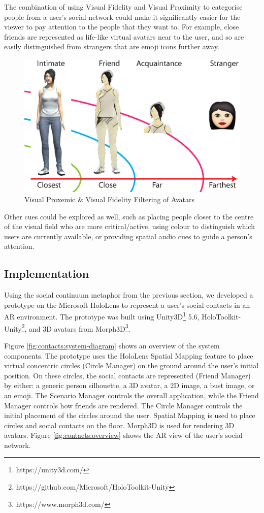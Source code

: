 The combination of using Visual Fidelity and Visual Proximity to categorise people from a user's social network could make it significantly easier for the viewer to pay attention to the people that they want to. For example, close friends are represented as life-like virtual avatars near to the user, and so are easily distinguished from strangers that are emoji icons further away.

\begin{figure}[ht]
  \centering
  \includegraphics[width=0.8\linewidth]{images/mgia17/writing-images-11.eps}
  \caption{Visual Proxemic \& Visual Fidelity Filtering of Avatars}
    \label{fig:contacts:proximic-circles}
\end{figure}

Other cues could be explored as well, such as placing people closer to the centre of the visual field who are more critical/active, using colour to distinguish which users are currently available, or providing spatial audio cues to guide a person's attention.


\subsection{Implementation}

Using the social continuum metaphor from the previous section, we developed a prototype on the Microsoft HoloLens to represent a user's social contacts in an AR environment. The prototype was built using Unity3D\footnote{https://unity3d.com/} 5.6, HoloToolkit-Unity\footnote{https://github.com/Microsoft/HoloToolkit-Unity}, and 3D avatars from Morph3D\footnote{https://www.morph3d.com/}. 

Figure \ref{fig:contacts:system-diagram} shows an overview of the system components. The prototype uses the HoloLens Spatial Mapping feature to place virtual concentric circles (Circle Manager) on the ground around the user's initial position. On these circles, the social contacts are represented (Friend Manager) by either: a generic person silhouette, a 3D avatar, a 2D image, a bust image, or an emoji. The Scenario Manager controls the overall application, while the Friend Manager controls how friends are rendered. The Circle Manager controls the initial placement of the circles around the user. Spatial Mapping is used to place circles and social contacts on the floor. Morph3D is used for rendering 3D avatars. Figure \ref{fig:contacts:overview} shows the AR view of the user's social network.


